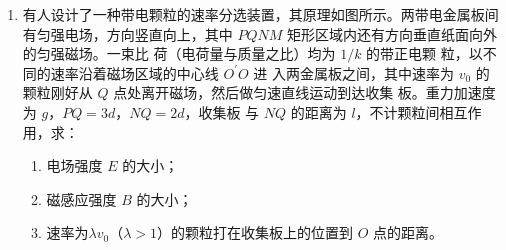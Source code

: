 \begin{enumerate}
\item 
{}
有人设计了一种带电颗粒的速率分选装置，其原理如图所示。两带电金属板间
有匀强电场，方向竖直向上，其中 $ PQNM $ 矩形区域内还有方向垂直纸面向外的匀强磁场。一束比
荷（电荷量与质量之比）均为 $ 1/k $ 的带正电颗
粒，以不同的速率沿着磁场区域的中心线 $ O ^{\prime} O $ 进
入两金属板之间，其中速率为 $ v_{0} $ 的颗粒刚好从 $ Q $
点处离开磁场，然后做匀速直线运动到达收集
板。重力加速度为 $ g $，$ PQ=3d $，$ NQ=2d $，收集板
与 $ NQ $ 的距离为 $ l $，不计颗粒间相互作用，求：
\begin{enumerate}
	\item
电场强度 $ E $ 的大小；

\item 
磁感应强度 $ B $ 的大小；

\item 
速率为$ \lambda v_{0} $（$ \lambda >1 $）的颗粒打在收集板上的位置到 $ O $ 点的距离。

	
\end{enumerate}
\begin{figure}[h!]
	\flushright
	
\end{figure}






\end{enumerate}
